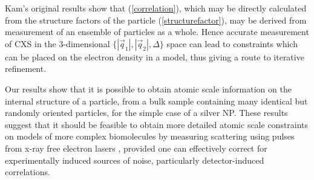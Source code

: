 \documentclass [11pt,fleqn]{article}
\begin{document}
Kam's original results \cite{Kam:1977wc} show that (\ref{correlation}), which may be directly calculated from the structure factors of the particle (\ref{structurefactor}), may be derived from measurement of an ensemble of particles as a whole. Hence accurate measurement of CXS in the 3-dimensional $\{|\vec{q}_1|,|\vec{q}_2|,\Delta\}$ space can lead to constraints which can be placed on the electron density in a model, thus giving a route to iterative refinement. 

Our results show that it is possible to obtain atomic scale information on the internal structure of a particle, from a bulk sample containing many identical  but randomly oriented particles, for the simple case of a silver NP. These results suggest that it should be feasible to obtain more detailed atomic scale constraints on models of more complex biomolecules by measuring scattering using pulses from x-ray free electron lasers \cite{Neutze:2000ih, Spence:2012eo}, provided one can effectively correct for experimentally induced sources of noise, particularly detector-induced correlations.
\end{document}
